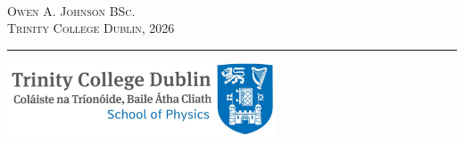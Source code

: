 \begin{titlepage}

\raggedleft %


\makeatletter
\textsc{{ \huge \bfseries \thesistitle}}\\[1.5cm] %

\vfill

\large \textsc{\supervisor} \\ 
\ifdefined\school
\large \textsc{\school} \\[1.5cm] 

\textsc{\Large Owen A. Johnson BSc.} \\
\textsc{{\Large Trinity College Dublin, 2026}}\\ 
\noindent\rule{0.5\textwidth}{0.75pt}

\includegraphics[width = 8cm]{title/tcd-logo.jpg}


\end{titlepage}